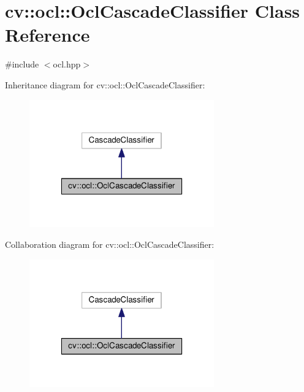 \hypertarget{classcv_1_1ocl_1_1OclCascadeClassifier}{\section{cv\-:\-:ocl\-:\-:Ocl\-Cascade\-Classifier Class Reference}
\label{classcv_1_1ocl_1_1OclCascadeClassifier}
}


{\ttfamily \#include $<$ocl.\-hpp$>$}



Inheritance diagram for cv\-:\-:ocl\-:\-:Ocl\-Cascade\-Classifier\-:\nopagebreak
\begin{figure}[H]
\begin{center}
\leavevmode
\includegraphics[width=226pt]{classcv_1_1ocl_1_1OclCascadeClassifier__inherit__graph}
\end{center}
\end{figure}


Collaboration diagram for cv\-:\-:ocl\-:\-:Ocl\-Cascade\-Classifier\-:\nopagebreak
\begin{figure}[H]
\begin{center}
\leavevmode
\includegraphics[width=226pt]{classcv_1_1ocl_1_1OclCascadeClassifier__coll__graph}
\end{center}
\end{figure}
